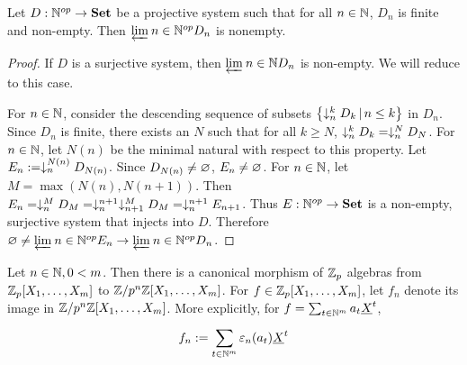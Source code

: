 \begin{prop}
  
  Let $D : \mathbb{N}^{op} \to \mathbf{Set}$ be a projective system 
  such that for all $n\in \mathbb{N}$, $D_n$ is finite and non-empty. 
  Then $\varprojlim_{{}}{n \in \mathbb{N}^{op}} D_n$ is nonempty. 
\end{prop}
\begin{proof}
  If $D$ is a surjective system, then $\varprojlim_{{}}{n \in \mathbb{N}} D_n$ is non-empty. 
  We will reduce to this case. 

  For $n \in \mathbb{N}$, 
  consider the descending sequence of subsets 
  $\left\{\downarrow_{n}^{k} D_k \,|\, n \leq k\right\}$ in $D_n$. 
  Since $D_n$ is finite, 
  there exists an $N$ such that for all $k \geq N$, 
  $\downarrow_{n}^{k} D_k = \downarrow_{n}^{N} D_N$.
  For $n \in \mathbb{N}$, 
  let $N(n)$ be the minimal natural with respect to this property. 
  Let $E_n := \downarrow_{n}^{N(n)} D_{N(n)}$.
  Since $D_{N(n)} \neq \varnothing$, $E_n \neq \varnothing$. 
  For $n \in \mathbb{N}$, 
  let $M = \max(N(n),N(n+1))$. 
  Then $E_n = \downarrow_{n}^{M} D_M = \downarrow_{n}^{n+1}\downarrow_{n+1}^{M} D_M 
  = \downarrow_{n}^{n+1} E_{n+1}$. 
  Thus $E : \mathbb{N}^{op} \to \mathbf{Set}$ is a non-empty, surjective system that
  injects into $D$. 
  Therefore $\varnothing \neq \varprojlim_{{}}{n\in \mathbb{N}^{op}} E_n \to \varprojlim_{{}}{n\in\mathbb{N}^{op}} D_n$.
\end{proof}

\begin{notation}
  Let $n \in \mathbb{N}, 0 < m$. 
  Then there is a canonical morphism of $\mathbb{Z}_p$ algebras from 
  $\mathbb{Z}_p[X_1,\dots,X_m]$ to $\mathbb{Z}/p^n\mathbb{Z}[X_1,\dots,X_m]$.
  For $f \in \mathbb{Z}_p[X_1,\dots,X_m]$,
  let $f_n$ denote its image in $\mathbb{Z}/p^n\mathbb{Z}[X_1,\dots,X_m]$. 
  More explicitly, for $f = \sum_{t \in \mathbb{N}^m}^{} a_t \underline{X}^t$,
  \[
    f_n := \sum_{t \in \mathbb{N}^m}^{} \varepsilon_n(a_t) \underline{X}^t
  \]
\end{notation}

